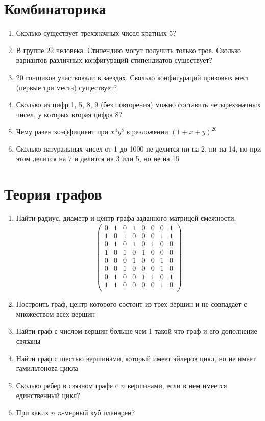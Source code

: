 \documentclass{paper}
\begin{document}
\section{Комбинаторика}
\begin{enumerate}
    \item Сколько существует трехзначных чисел кратных 5?
    \item В группе 22 человека.
    Стипендию могут получить только трое.
    Сколько вариантов различных конфигураций стипендиатов существует?
    \item 20 гонщиков участвовали в заездах. 
    Сколько конфигураций призовых мест (первые три места) существует?
    \item Сколько из цифр 1, 5, 8, 9 (без повторения) можно составить четырехзначных чисел, у которых вторая цифра 8?
    \item Чему равен коэффициент при $x^4y^8$ в разложении $(1 + x + y)^{20}$
    \item Сколько натуральных чисел от 1 до 1000 
    не делится ни на 2, 
    ни на 14, 
    но при этом делится на 7 и делится на 3 или 5, 
    но не на 15
\end{enumerate}
\section{Теория графов}
\begin{enumerate}
    \item Найти радиус, диаметр и центр графа заданного матрицей смежности:
    \[
        \begin{pmatrix}
            0 & 1 & 0 & 1 & 0 & 0 & 0 & 1\\
            1 & 0 & 1 & 0 & 0 & 0 & 1 & 1\\
            0 & 1 & 0 & 1 & 0 & 1 & 0 & 0\\
            1 & 0 & 1 & 0 & 1 & 0 & 0 & 0\\
            0 & 0 & 0 & 1 & 0 & 0 & 1 & 0\\
            0 & 0 & 1 & 0 & 0 & 0 & 1 & 0\\
            0 & 1 & 0 & 0 & 1 & 1 & 0 & 1\\
            1 & 1 & 0 & 0 & 0 & 0 & 1 & 0\\
        \end{pmatrix}
    \]
    \item Построить граф, центр которого состоит из трех вершин и не совпадает с множеством всех вершин
    \item Найти граф с числом вершин больше чем 1 такой что граф и его дополнение связаны
    \item Найти граф с шестью вершинами, который имеет эйлеров цикл, но не имеет гамильтонова цикла
    \item Сколько ребер в связном графе с $n$ вершинами, если в нем имеется единственный цикл? 
    \item При каких $n$ $n$-мерный куб планарен?
\end{enumerate}
\end{document}
